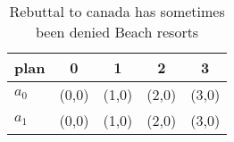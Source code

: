 \documentclass[a4paper]{article}
\begin{document}
\begin{table}
\begin{adjustbox}{width=0.5\columnwidth}
\begin{tabular}{|l|l|l|l|l|}
\hline
\textbf{plan} & \multicolumn{1}{c|}{\textbf{0}} & \multicolumn{1}{c|}{\textbf{1}} & \multicolumn{1}{c|}{\textbf{2}} & \multicolumn{1}{c|}{\textbf{3}} \\ \hline
\textbf{$a_0$}  & (0,0) & (1,0) & (2,0) & (3,0) \\ \hline
\textbf{$a_1$}  & (0,0) & (1,0) & (2,0) & (3,0) \\ \hline
\end{tabular}
\end{adjustbox}
\caption{Rebuttal to canada has sometimes been denied Beach resorts 
}
\end{table}
\end{document}
